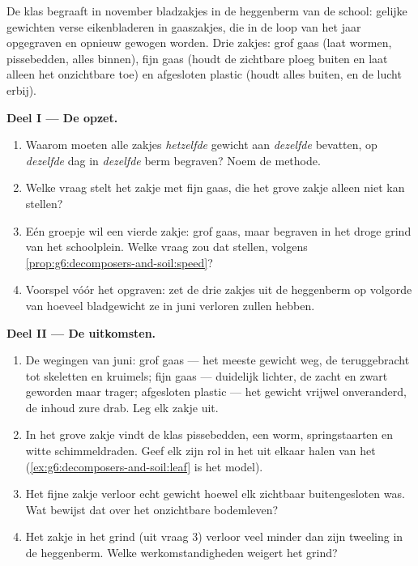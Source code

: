 \begin{problem}\label{pb:g6:decomposers-and-soil:1}
De klas begraaft in november bladzakjes in de heggenberm van de school:
gelijke gewichten verse eikenbladeren in gaaszakjes, die in de loop van
het jaar opgegraven en opnieuw gewogen worden. Drie  zakjes: grof
gaas (laat wormen, pissebedden, alles binnen), fijn gaas (houdt de
zichtbare ploeg buiten en laat alleen het onzichtbare toe) en afgesloten
plastic (houdt alles buiten, en de lucht erbij).

\medskip\noindent\textbf{Deel I --- De opzet.}
\begin{enumerate}
  \item Waarom moeten alle zakjes \emph{hetzelfde} gewicht aan
        \emph{dezelfde}  bevatten, op \emph{dezelfde} dag in
        \emph{dezelfde} berm begraven? Noem de methode.
  \item Welke vraag stelt het zakje met fijn gaas, die het grove zakje
        alleen niet kan stellen?
  \item Eén groepje wil een vierde zakje: grof gaas, maar begraven in
        het droge grind van het schoolplein. Welke vraag zou dat stellen,
        volgens \cref{prop:g6:decomposers-and-soil:speed}?
  \item Voorspel vóór het opgraven: zet de drie zakjes uit de heggenberm
        op volgorde van hoeveel bladgewicht ze in juni verloren zullen
        hebben.
\end{enumerate}

\medskip\noindent\textbf{Deel II --- De uitkomsten.}
\begin{enumerate}[resume]
  \item De wegingen van juni: grof gaas --- het meeste gewicht weg, de
         teruggebracht tot skeletten en kruimels; fijn gaas ---
        duidelijk lichter, de  zacht en zwart geworden maar
        trager; afgesloten plastic --- het gewicht vrijwel onveranderd,
        de inhoud zure drab. Leg elk zakje uit.
  \item In het grove zakje vindt de klas pissebedden, een worm,
        springstaarten en witte schimmeldraden. Geef elk zijn rol in het
        uit elkaar halen van het 
        (\cref{ex:g6:decomposers-and-soil:leaf} is het model).
  \item Het fijne zakje verloor echt gewicht hoewel elk zichtbaar 
        buitengesloten was. Wat bewijst dat over het onzichtbare
        bodemleven?
  \item Het zakje in het grind (uit vraag 3) verloor veel minder dan zijn
        tweeling in de heggenberm. Welke werkomstandigheden weigert het
        grind?
\end{enumerate}


\end{problem}
